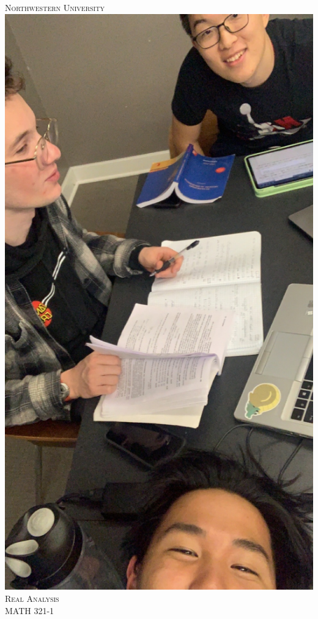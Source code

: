 \documentclass{article}
\begin{document}
\begin{titlepage}

\newcommand{\HRule}{\rule{\linewidth}{0.5mm}} %

\center %
 

\textsc{\LARGE Northwestern University}\\[1.5cm] %
\includegraphics[scale=.1]{IMG_6914.JPG}\\[2cm] %
\textsc{\Large Real Analysis}\\[0.5cm] %
\textsc{\large MATH 321-1}\\[0.5cm] %


\end{titlepage}
\end{document}
